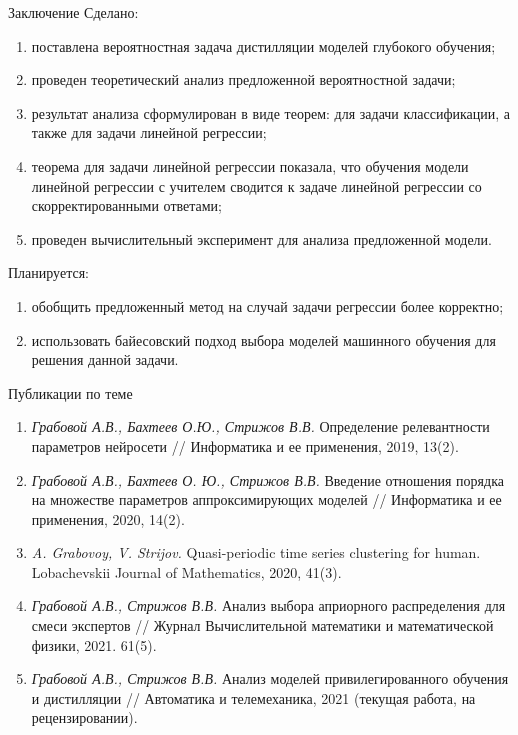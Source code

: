 \documentclass[10pt,pdf,hyperref={unicode}]{beamer}
\begin{document}
\begin{frame}{Заключение}
\justifying
Сделано:
	\begin{enumerate}
	\justifying
		\item поставлена вероятностная задача дистилляции моделей глубокого обучения;
		\item проведен теоретический анализ предложенной вероятностной задачи;
		\item результат анализа сформулирован в виде теорем: для задачи классификации, а также для задачи линейной регрессии;
		\item теорема для задачи линейной регрессии показала, что обучения модели линейной регрессии с учителем сводится к задаче линейной регрессии со скорректированными ответами;
		\item проведен вычислительный эксперимент для анализа предложенной модели.
	\end{enumerate}

Планируется:
	\begin{enumerate}
	\justifying
		\item обобщить предложенный метод на случай задачи регрессии более корректно;
		\item использовать байесовский подход выбора моделей машинного обучения для решения данной задачи.
	\end{enumerate}	

\end{frame}

\begin{frame}{Публикации по теме}
\justifying
\begin{enumerate}
\item \textit{Грабовой А.В., Бахтеев О.Ю., Стрижов В.В.} Определение релевантности параметров нейросети // Информатика и ее применения, 2019, 13(2).
\item \textit{Грабовой А.В., Бахтеев О. Ю., Стрижов В.В.} Введение отношения порядка на множестве параметров аппроксимирующих моделей // Информатика и ее применения, 2020, 14(2).
\item \textit{A. Grabovoy, V. Strijov.} Quasi-periodic time series clustering for human. Lobachevskii Journal of Mathematics, 2020, 41(3).
\item \textit{Грабовой А.В., Стрижов В.В.} Анализ выбора априорного распределения для смеси экспертов // Журнал Вычислительной математики и математической физики, 2021. 61(5).
\item \textit{Грабовой А.В., Стрижов В.В.} Анализ моделей привилегированного обучения и дистилляции // Автоматика и телемеханика, 2021 (текущая работа, на рецензировании).
\end{enumerate}

\end{frame}
\end{document}
